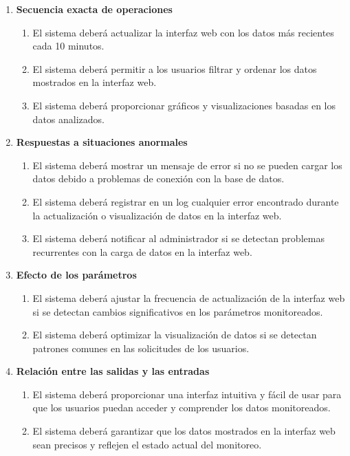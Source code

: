 \begin{enumerate}
\begin{enumerate}
            \item \textbf{Secuencia exacta de operaciones}
                \begin{enumerate}
                    \item El sistema deberá actualizar la interfaz web con los datos más recientes cada 10 minutos.
                    \item El sistema deberá permitir a los usuarios filtrar y ordenar los datos mostrados en la interfaz web.
                    \item El sistema deberá proporcionar gráficos y visualizaciones basadas en los datos analizados.
                \end{enumerate}   
        
            \item \textbf{Respuestas a situaciones anormales}
                \begin{enumerate}
                    \item El sistema deberá mostrar un mensaje de error si no se pueden cargar los datos debido a problemas de conexión con la base de datos.
                    \item El sistema deberá registrar en un log cualquier error encontrado durante la actualización o visualización de datos en la interfaz web.
                    \item El sistema deberá notificar al administrador si se detectan problemas recurrentes con la carga de datos en la interfaz web.
                \end{enumerate}   
       
            \item \textbf{Efecto de los parámetros}
                \begin{enumerate}
                    \item El sistema deberá ajustar la frecuencia de actualización de la interfaz web si se detectan cambios significativos en los parámetros monitoreados.
                    \item El sistema deberá optimizar la visualización de datos si se detectan patrones comunes en las solicitudes de los usuarios.
                \end{enumerate}   
        
            \item \textbf{Relación entre las salidas y las entradas}
                \begin{enumerate}
                    \item El sistema deberá proporcionar una interfaz intuitiva y fácil de usar para que los usuarios puedan acceder y comprender los datos monitoreados.
                    \item El sistema deberá garantizar que los datos mostrados en la interfaz web sean precisos y reflejen el estado actual del monitoreo.
                \end{enumerate}
        \end{enumerate}

\end{enumerate}